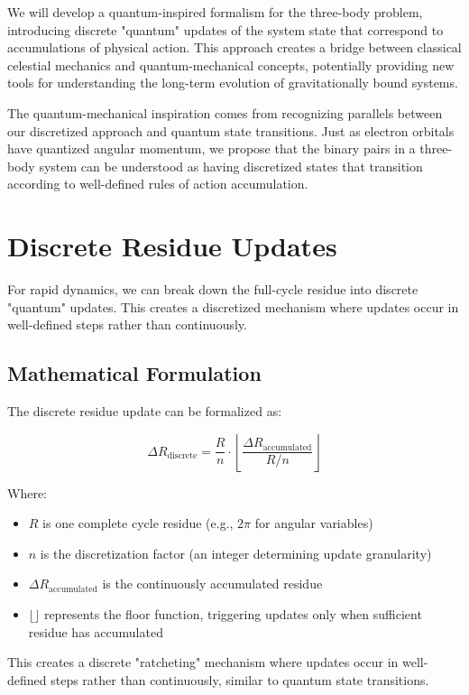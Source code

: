 \documentclass{article}
\begin{document}
We will develop a quantum-inspired formalism for the three-body problem, introducing discrete "quantum" updates of the system state that correspond to accumulations of physical action. This approach creates a bridge between classical celestial mechanics and quantum-mechanical concepts, potentially providing new tools for understanding the long-term evolution of gravitationally bound systems.

The quantum-mechanical inspiration comes from recognizing parallels between our discretized approach and quantum state transitions. Just as electron orbitals have quantized angular momentum, we propose that the binary pairs in a three-body system can be understood as having discretized states that transition according to well-defined rules of action accumulation.

\section{Discrete Residue Updates}

For rapid dynamics, we can break down the full-cycle residue into discrete "quantum" updates. This creates a discretized mechanism where updates occur in well-defined steps rather than continuously.

\subsection{Mathematical Formulation}

The discrete residue update can be formalized as:

\begin{equation}
\Delta R_{\text{discrete}} = \frac{R}{n} \cdot \left\lfloor \frac{\Delta R_{\text{accumulated}}}{R/n} \right\rfloor
\end{equation}

Where:
\begin{itemize}
\item $R$ is one complete cycle residue (e.g., $2\pi$ for angular variables)
\item $n$ is the discretization factor (an integer determining update granularity)
\item $\Delta R_{\text{accumulated}}$ is the continuously accumulated residue
\item $\lfloor \rfloor$ represents the floor function, triggering updates only when sufficient residue has accumulated
\end{itemize}

This creates a discrete "ratcheting" mechanism where updates occur in well-defined steps rather than continuously, similar to quantum state transitions.
\end{document}
